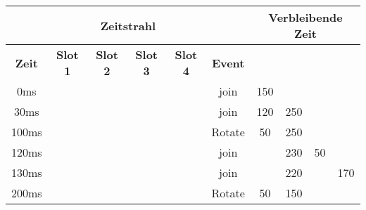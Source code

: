 \begin{frame}
    \begin{table}[]
        \begin{adjustbox}{width=0.8\textwidth}
            \begin{tabular}{c|cccc|c|cccc}
                \multicolumn{6}{c}{\textbf{Zeitstrahl}} & \multicolumn{4}{|c}{\textbf{Verbleibende Zeit}}                                                                                                                                                         \\ \hline
                \textbf{Zeit}                           & \textbf{Slot 1}                                 & \textbf{Slot 2} & \textbf{Slot 3} & \textbf{Slot 4} & \textbf{Event}   & \textbf{\PZero{}} & \textbf{\POne{}} & \textbf{\PTwo{}} & \textbf{\PThree{}} \\ \hline
                0ms                                     & \PZero{}                                        &                 &                 &                 & \PZero{} join    & \alert{150}       &                  &                  &                    \\
                \pause 30ms                             & \PZero{}                                        & \POne{}         &                 &                 & \POne{} join     & \alert{120}       & 250              &                  &                    \\
                \pause 100ms                            & \POne{}                                         & \PZero{}        &                 &                 & \alert{Rotate}   & \alert{50}        & 250              &                  &                    \\
                \pause 120ms                            & \POne{}                                         & \PZero{}        & \PTwo{}         &                 & \PTwo{} join     &                   & \alert{230}      & 50               &                    \\
                \pause 130ms                            & \POne{}                                         & \PZero{}        & \PTwo{}         & \PThree{}       & \PThree{} join   &                   & \alert{220}      &                  & 170                \\
                \pause 200ms                            & \PZero{}                                        & \PTwo{}         & \PThree{}       & \POne{}         & \alert{Rotate}   & 50                & \alert{150}      &                  &                    \\

\end{tabular}
\end{adjustbox}
\end{table}
\end{frame}
